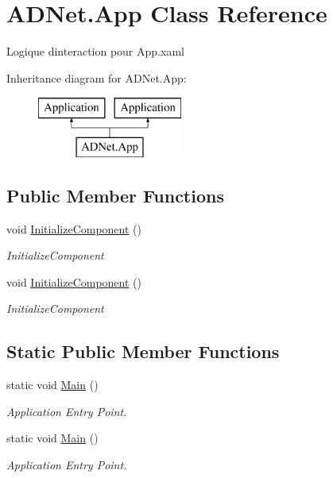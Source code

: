 \hypertarget{class_a_d_net_1_1_app}{}\section{A\+D\+Net.\+App Class Reference}
\label{class_a_d_net_1_1_app}


Logique d\textquotesingle{}interaction pour App.\+xaml  


Inheritance diagram for A\+D\+Net.\+App\+:\begin{figure}[H]
\begin{center}
\leavevmode
\includegraphics[height=2.000000cm]{class_a_d_net_1_1_app}
\end{center}
\end{figure}
\subsection*{Public Member Functions}
\begin{DoxyCompactItemize}
\item 
void \hyperlink{class_a_d_net_1_1_app_a05e830ccf3131cb7f59efe3a96fe1fc2}{Initialize\+Component} ()
\begin{DoxyCompactList}\small\item\em Initialize\+Component \end{DoxyCompactList}\item 
void \hyperlink{class_a_d_net_1_1_app_a05e830ccf3131cb7f59efe3a96fe1fc2}{Initialize\+Component} ()
\begin{DoxyCompactList}\small\item\em Initialize\+Component \end{DoxyCompactList}\end{DoxyCompactItemize}
\subsection*{Static Public Member Functions}
\begin{DoxyCompactItemize}
\item 
static void \hyperlink{class_a_d_net_1_1_app_a6c2fcfdd007be4acda04c6965191e42b}{Main} ()
\begin{DoxyCompactList}\small\item\em Application Entry Point. \end{DoxyCompactList}\item 
static void \hyperlink{class_a_d_net_1_1_app_a6c2fcfdd007be4acda04c6965191e42b}{Main} ()
\begin{DoxyCompactList}\small\item\em Application Entry Point. \end{DoxyCompactList}\end{DoxyCompactItemize}


